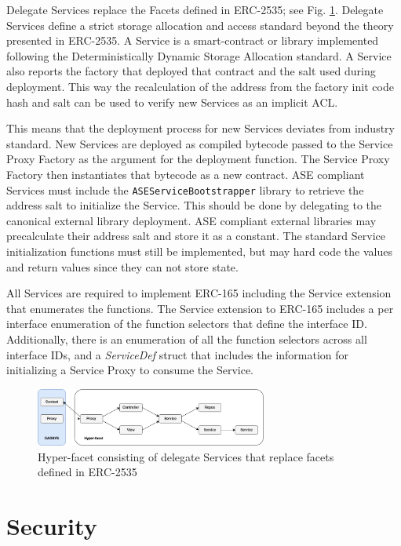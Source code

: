 \documentclass[journal,twocolumn,12pt]{ieeesyscoin}
\begin{document}
Delegate Services replace the Facets defined in ERC-2535; see Fig. \ref{fig:hyper_facet}. Delegate Services define a strict storage allocation and access standard beyond the theory presented in ERC-2535. A Service is a smart-contract or library implemented following the Deterministically Dynamic Storage Allocation standard. A Service also reports the factory that deployed that contract and the salt used during deployment. This way the recalculation of the address from the factory init code hash and salt can be used to verify new Services as an implicit ACL.

This means that the deployment process for new Services deviates from industry standard. New Services are deployed as compiled bytecode passed to the Service Proxy Factory as the argument for the deployment function. The Service Proxy Factory then instantiates that bytecode as a new contract. ASE compliant Services must include the \texttt{ASEServiceBootstrapper} library to retrieve the address salt to initialize the Service. This should be done by delegating to the canonical external library deployment. ASE compliant external libraries may precalculate their address salt and store it as a constant. The standard Service initialization functions must still be implemented, but may hard code the values and return values since they can not store state.

All Services are required to implement ERC-165 including the Service extension that enumerates the functions. The Service extension to ERC-165 includes a per interface enumeration of the function selectors that define the interface ID. Additionally, there is an enumeration of all the function selectors across all interface IDs, and a \textit{ServiceDef} struct that includes the information for initializing a Service Proxy to consume the Service.

\begin{figure}[h!]
\includegraphics[width=3in]{img/hyper_facet.png}
\caption{Hyper-facet consisting of delegate Services that replace facets defined in ERC-2535} 
\label{fig:hyper_facet}
\end{figure} 

\section{Security}
\label{sec:security}
\end{document}

